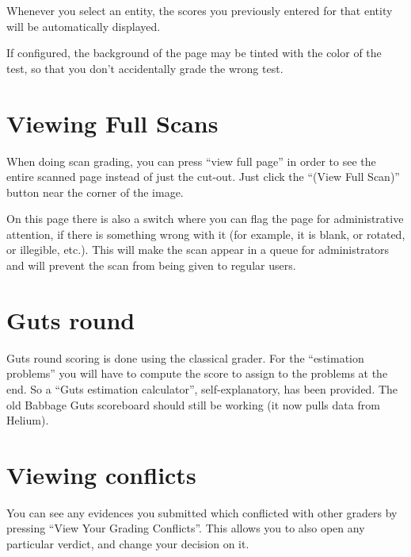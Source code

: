 Whenever you select an entity,
the scores you previously entered for that
entity will be automatically displayed.

If configured, the background of the page may be tinted
with the color of the test, so that you don't accidentally grade
the wrong test.

\section{Viewing Full Scans}
\label{sec:view_full}
When doing scan grading, you can press ``view full page''
in order to see the entire scanned page instead of just the cut-out.
Just click the ``(View Full Scan)'' button near the corner of the image.

On this page there is also a switch where you can flag the page
for administrative attention, if there is something wrong with it
(for example, it is blank, or rotated, or illegible, etc.).
This will make the scan appear in a queue for administrators
and will prevent the scan from being given to regular users.

\section{Guts round}
\begin{itemize}
	\ii Guts round scoring is done using the classical grader.
	\ii For the ``estimation problems'' you will have to compute the score
	to assign to the problems at the end.
	So a ``Guts estimation calculator'', self-explanatory,
	has been provided.
	\ii The old Babbage Guts scoreboard should still be working
	(it now pulls data from Helium).
\end{itemize}

\section{Viewing conflicts}
You can see any evidences you submitted which conflicted with other graders
by pressing ``View Your Grading Conflicts''.
This allows you to also open any particular verdict,
and change your decision on it.

